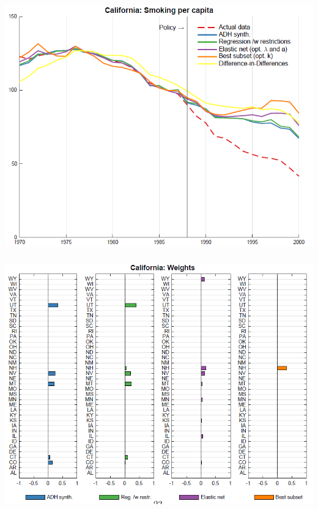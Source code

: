 \begin{frame}
  \frametitle{}
  \begin{center}
    \includegraphics[width=\textwidth]{./resources/DI_CA_trends}
  \end{center}  
\end{frame}

\begin{frame}
  \frametitle{}
  \begin{center}
    \includegraphics[width=\textwidth]{./resources/DI_CAstates}
  \end{center}  
\end{frame}



